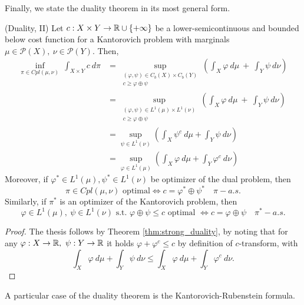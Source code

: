 \documentclass[../main.tex]{subfiles}
\begin{document}
Finally, we state the duality theorem in its most general form.

\begin{theorem}
    (Duality, II) Let $c: X\times Y\to \mathbb{R}\cup\{+\infty\}$ be a lower-semicontinuous and bounded below cost function for a Kantorovich problem with marginals $\mu\in\mathcal{P}(X), \ \nu\in\mathcal{P}(Y)$. Then, 
    \begin{align*}
        \inf_{\pi\in Cpl(\mu, \nu)} \ \int_{X\times Y} c \ d\pi 
        &= \sup_{\substack{(\varphi, \psi)\in C_b(X)\times C_b(Y) \\ c\geq \varphi\oplus\psi}} \left(\int_X \varphi \ d\mu \ + \ \int_Y \psi \ d\nu \right) \\
        &= \sup_{\substack{(\varphi, \psi)\in L^1(\mu)\times L^1(\nu) \\ c\geq \varphi\oplus\psi}} \left(\int_X \varphi \ d\mu \ + \ \int_Y \psi \ d\nu \right) \\
        &= \sup_{\psi\in L^1(\nu)} \left(\int_X \psi^c \ d\mu + \int_Y \psi \ d\nu\right) \\
        &= \sup_{\varphi\in L^1(\mu)} \left(\int_X \varphi \ d\mu + \int_Y \varphi^c \ d\nu\right)
    \end{align*}
    Moreover, if $\varphi^*\in L^1(\mu), \psi^*\in L^1(\nu)$ be optimizer of the dual problem, then
    $$
    \pi\in Cpl(\mu, \nu) \text{ optimal} \iff c = \varphi^* \oplus \psi^* \quad \pi-a.s.
    $$
    Similarly, if $\pi^*$ is an optimizer of the Kantorovich problem, then
    $$
    \varphi\in L^1(\mu), \ \psi\in L^1(\nu) \text{ s.t. $\varphi\oplus\psi\leq c$ optimal } \iff c = \varphi \oplus \psi \quad \pi^*-a.s.
    $$
\end{theorem}
\begin{proof}
    The thesis follows by Theorem \ref{thm:strong_duality}, by noting that for any $\varphi: X \to \mathbb{R}, \ \psi: Y\to\mathbb{R}$ it holds $\varphi + \varphi^c\leq c$ by definition of $c$-transform, with 
    $$
    \int_X \varphi \ d\mu + \int_Y \psi \ d\nu \leq \int_X \varphi \ d\mu + \int_Y \varphi^c \ d\nu.
    $$
\end{proof}

A particular case of the duality theorem is the Kantorovich-Rubenstein formula.
\end{document}
